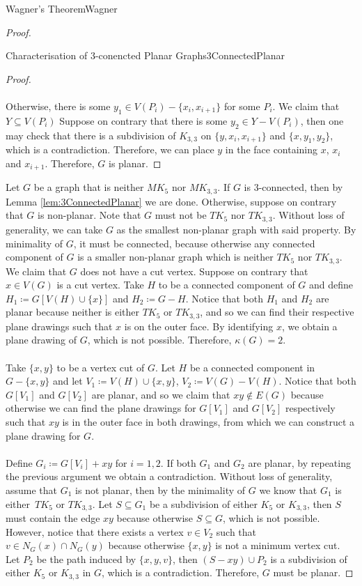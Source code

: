 \documentclass[math]{amznotes}
\theoremstyle{remark}
\begin{document}
\begin{thmbox}{Wagner's Theorem}{Wagner}
\begin{proof}
\begin{lembox}{Characterisation of $3$-conencted Planar Graphs}{3ConnectedPlanar}
\begin{proof}
                \\\\
                Otherwise, there is some $y_1 \in V(P_i) - \{x_i, x_{i + 1}\}$ for some $P_i$. We claim that $Y \subseteq V(P_i)$ Suppose on contrary that there is some $y_2 \in Y - V(P_i)$, then one may check that there is a subdivision of $K_{3, 3}$ on $\{y, x_i, x_{i + 1}\}$ and $\{x, y_1, y_2\}$, which is a contradiction. Therefore, we can place $y$ in the face containing $x$, $x_i$ and $x_{i + 1}$. Therefore, $G$ is planar.
            \end{proof}
        \end{lembox}
        Let $G$ be a graph that is neither $MK_5$ nor $MK_{3, 3}$. If $G$ is $3$-connected, then by Lemma \ref{lem:3ConnectedPlanar} we are done. Otherwise, suppose on contrary that $G$ is non-planar. Note that $G$ must not be $TK_5$ nor $TK_{3, 3}$. Without loss of generality, we can take $G$ as the smallest non-planar graph with said property. By minimality of $G$, it must be connected, because otherwise any connected component of $G$ is a smaller non-planar graph which is neither $TK_5$ nor $TK_{3, 3}$. We claim that $G$ does not have a cut vertex. Suppose on contrary that $x \in V(G)$ is a cut vertex. Take $H$ to be a connected component of $G$ and define $H_1 \coloneqq G[V(H) \cup \{x\}]$ and $H_2 \coloneqq G - H$. Notice that both $H_1$ and $H_2$ are planar because neither is either $TK_5$ or $TK_{3, 3}$, and so we can find their respective plane drawings such that $x$ is on the outer face. By identifying $x$, we obtain a plane drawing of $G$, which is not possible. Therefore, $\kappa(G) = 2$. 
        \\\\
        Take $\{x, y\}$ to be a vertex cut of $G$. Let $H$ be a connected component in $G - \{x, y\}$ and let $V_1 \coloneqq V(H) \cup \{x, y\}$, $V_2 \coloneqq V(G) - V(H)$. Notice that both $G[V_1]$ and $G[V_2]$ are planar, and so we claim that $xy \notin E(G)$ because otherwise we can find the plane drawings for $G[V_1]$ and $G[V_2]$ respectively such that $xy$ is in the outer face in both drawings, from which we can construct a plane drawing for $G$. 
        \\\\
        Define $G_i \coloneqq G[V_i] + xy$ for $i = 1, 2$. If both $G_1$ and $G_2$ are planar, by repeating the previous argument we obtain a contradiction. Without loss of generality, assume that $G_1$ is not planar, then by the minimality of $G$ we know that $G_1$ is either~$TK_5$ or $TK_{3, 3}$. Let $S \subseteq G_1$ be a subdivision of either $K_5$ or $K_{3, 3}$, then $S$ must contain the edge $xy$ because otherwise $S \subseteq G$, which is not possible. However, notice that there exists a vertex $v \in V_2$ such that $v \in N_G(x) \cap N_G(y)$ because otherwise $\{x, y\}$ is not a minimum vertex cut. Let $P_2$ be the path induced by $\{x, y, v\}$, then $(S - xy) \cup P_2$ is a subdivision of either $K_5$ or $K_{3, 3}$ in $G$, which is a contradiction. Therefore, $G$ must be planar.
    \end{proof}
\end{thmbox}
\end{document}
